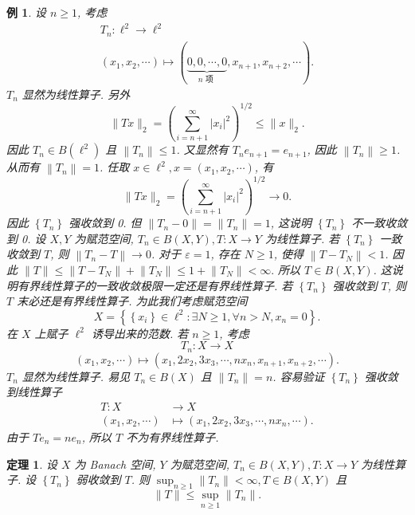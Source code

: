 \documentclass[openany]{ctexbook}
\theoremstyle{kaiti}
\newtheorem{theorem}{定理}[section]
\theoremstyle{normal}
\newtheorem{example}{例}[section]
\begin{document}
\begin{example}
设 $n \geqslant 1$, 考虑
$$
\begin{gathered}
T_n: \ell^2 \rightarrow \ell^2 \\
\left(x_1, x_2, \cdots\right) \mapsto(\underbrace{0,0, \cdots, 0}_{n \text { 项 }}, x_{n+1}, x_{n+2}, \cdots).
\end{gathered}
$$
$T_n$ 显然为线性算子. 另外
$$
\|T x\|_2=\left(\sum_{i=n+1}^{\infty}\left|x_{i}\right|^2\right)^{1 / 2} \leqslant\|x\|_2.
$$
因此 $T_n \in B\left(\ell^2\right)$ 且 $\left\|T_n\right\| \leqslant 1$. 又显然有 $T_n e_{n+1}=e_{n+1}$, 因此 $\left\|T_n\right\| \geqslant 1$. 从而有 $\left\|T_n\right\|=1$. 任取 $x \in \ell^2, x=\left(x_1, x_2, \cdots\right)$, 有
$$
\|T x\|_2=\left(\sum_{i=n+1}^{\infty}\left|x_{i}\right|^2\right)^{1 / 2} \rightarrow 0.
$$
因此 $\left\{T_n\right\}$ 强收敛到 0. 但 $\left\|T_n-0\right\|=\left\|T_n\right\|=1$, 这说明 $\left\{T_n\right\}$ 不一致收敛到 0.
设 $X, Y$ 为赋范空间, $T_n \in B(X, Y), T: X \rightarrow Y$ 为线性算子. 若 $\left\{T_n\right\}$ 一致收敛到 $T$, 则 $\left\|T_n-T\right\| \rightarrow 0$. 对于 $\varepsilon=1$, 存在 $N \geqslant 1$, 使得 $\left\|T-T_{N}\right\|<1$. 因此
$\|T\| \leqslant\left\|T-T_{N}\right\|+\left\|T_{N}\right\| \leqslant 1+\left\|T_{N}\right\|<\infty.$
所以 $T \in B(X, Y)$. 这说明有界线性算子的一致收敛极限一定还是有界线性算子. 若 $\left\{T_n\right\}$ 强收敛到 $T$, 则 $T$ 末必还是有界线性算子. 为此我们考虑赋范空间
$$
X=\left\{\left\{x_{i}\right\} \in \ell^2: \exists N \geqslant 1, \forall n>N, x_n=0\right\}.
$$
在 $X$ 上赋子 $\ell^2$ 诱导出来的范数. 若 $n \geqslant 1$, 考虑
$$
T_n: X \rightarrow X
$$
$$
\left(x_1, x_2, \cdots\right) \mapsto\left(x_1, 2 x_2, 3 x_3, \cdots, n x_n, x_{n+1}, x_{n+2}, \cdots\right).
$$
$T_n$ 显然为线性算子. 易见 $T_n \in B(X)$ 且 $\left\|T_n\right\|=n$. 容易验证 $\left\{T_n\right\}$ 强收敛到线性算子
$$
\begin{aligned}
T: X & \rightarrow X \\
\left(x_1, x_2, \cdots\right) & \mapsto\left(x_1, 2 x_2, 3 x_3, \cdots, n x_n, \cdots\right).
\end{aligned}
$$
由于 $T e_n=n e_n$, 所以 $T$ 不为有界线性算子.
\end{example}

\begin{theorem}
设 $X$ 为 Banach 空间, $Y$ 为赋范空间, $T_n \in B(X, Y), T: X \rightarrow Y$ 为线性算子. 设 $\left\{T_n\right\}$ 弱收敛到 $T$. 则 $\sup_{n \geqslant 1}\left\|T_n\right\|<\infty, T \in B(X, Y)$ 且
$$
\|T\| \leqslant \sup_{n \geqslant 1}\left\|T_n\right\|.
$$
\end{theorem}
\end{document}
